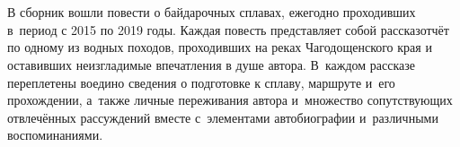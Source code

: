 \chapter*{}

В сборник вошли повести о байдарочных сплавах, ежегодно проходивших в~период с 2015 по 2019 годы. Каждая повесть представляет собой рассказ\sdash отчёт по одному из водных походов, проходивших на реках Чагодощенского края и оставивших неизгладимые впечатления в душе автора. В~каждом рассказе переплетены воедино сведения о подготовке к сплаву, маршруте и~его прохождении, а~также личные переживания автора и~множество сопутствующих отвлечённых рассуждений вместе с~элементами автобиографии и~различными воспоминаниями.

\vspace{\fill}
